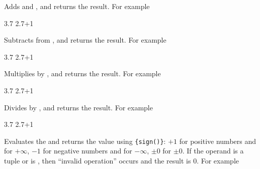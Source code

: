 \documentclass[oneside]{book}
\begin{document}
\begin{function}{\FpMathAdd}
\begin{syntax}
  
\end{syntax}
Adds  and ,
and returns the result. For example
\begin{demohigh}
 {3.7}
 {2.7+1}
\end{demohigh}
\end{function}

\begin{function}{\FpMathSub}
\begin{syntax}
  
\end{syntax}
Subtracts  from ,
and returns the result. For example
\begin{demohigh}
 {3.7}
 {2.7+1}
\end{demohigh}
\end{function}

\begin{function}{\FpMathMult}
\begin{syntax}
  
\end{syntax}
Multiplies  by ,
and returns the result. For example
\begin{demohigh}
 {3.7}
 {2.7+1}
\end{demohigh}
\end{function}

\begin{function}{\FpMathDiv}
\begin{syntax}
  
\end{syntax}
Divides  by ,
and returns the result. For example
\begin{demohigh}
 {3.7}
 {2.7+1}
\end{demohigh}
\end{function}

\begin{function}{\FpMathSign}
\begin{syntax}
 
\end{syntax}
Evaluates the  and returns the value
using \verb|{sign(|\verb|)}|: $+1$ for positive
numbers and for $+\infty$, $-1$ for negative numbers and for
$-\infty$, $\pm 0$ for $\pm 0$.  If the operand is a tuple or is
\nan{}, then \enquote{invalid operation} occurs and the result
is $0$. For example
\begin{demohigh}
\end{demohigh}
\end{function}
\end{document}

